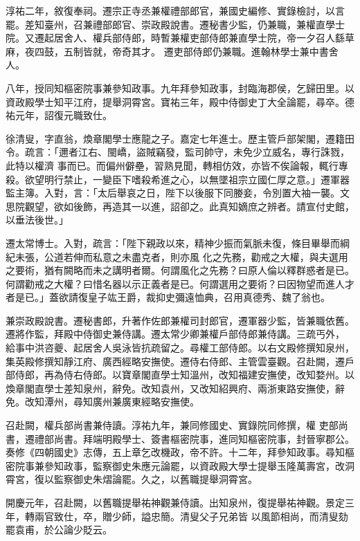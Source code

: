 \begin{pinyinscope}
 淳祐二年，敘復奉祠。遷宗正寺丞兼權禮部郎官，兼國史編修、實錄檢討，以言罷。差知臺州，召兼禮部郎官、崇政殿說書。遷秘書少監，仍兼職，兼權直學士院。又遷起居舍人、權兵部侍郎，時暫兼權吏部侍郎兼直學士院，帝一夕召人繇草麻，夜四鼓，五制皆就，帝奇其才。
 遷吏部侍郎仍兼職。進翰林學士兼中書舍人。



 八年，授同知樞密院事兼參知政事。九年拜參知政事，封臨海郡侯，乞歸田里。以資政殿學士知平江府，提舉洞霄宮。寶祐三年，殿中侍御史丁大全論罷，尋卒。德祐元年，詔復元職致仕。



 徐清叟，字直翁，煥章閣學士應龍之子。嘉定七年進士。歷主管戶部架閣，遷籍田令。疏言：「邇者江右、閩嶠，盜賊竊發，監司帥守，未免少立威名，專行誅戮，此特以權濟
 事而已。而偏州僻壘，習熟見聞，轉相仿效，亦皆不俟論報，輒行專殺。欲望明行禁止，一變臣下嗜殺希進之心，以無墜祖宗立國仁厚之意。」遷軍器監主簿。入對，言：「太后舉哀之日，陛下以後服下同媵妾，令別置大袖一襲。文思院觀望，欲如後飾，再造其一以進，詔卻之。此真知嫡庶之辨者。請宣付史館，以垂法後世。」



 遷太常博士。入對，疏言：「陛下親政以來，精神少振而氣脈未復，條目畢舉而綱紀未張，公道若伸而私意之未盡克者，則亦風
 化之先務，勸戒之大權，與夫選用之要術，猶有闕略而未之講明者爾。何謂風化之先務？曰原人倫以釋群惑者是已。何謂勸戒之大權？曰惜名器以示正義者是已。何謂選用之要術？曰因物望而進人才者是已。」蓋欲請復皇子竑王爵，裁抑史彌遠恤典，召用真德秀、魏了翁也。



 兼崇政殿說書。遷秘書郎，升著作佐郎兼權司封郎官，遷軍器少監，皆兼職依舊。遷將作監，拜殿中侍御史兼侍講。遷太常少卿兼權戶部侍郎兼侍講。三疏丐外，
 給事中洪咨夔、起居舍人吳泳皆抗疏留之。尋權工部侍郎。以右文殿修撰知泉州，集英殿修撰知靜江府、廣西經略安撫使。遷侍右侍郎、主管雲臺觀。召赴闕，遷戶部侍郎，再為侍右侍郎。以寶章閣直學士知溫州，改知福建安撫使，改知婺州。以煥章閣直學士差知泉州，辭免。改知袁州，又改知紹興府、兩浙東路安撫使，辭免。改知潭州，尋知廣州兼廣東經略安撫使。



 召赴闕，權兵部尚書兼侍讀。淳祐九年，兼同修國史、實錄院同修撰，權
 吏部尚書，遷禮部尚書。拜端明殿學士、簽書樞密院事，進同知樞密院事，封晉寧郡公。奏修《四朝國史》志傳，五上章乞改機政，帝不許。十二年，拜參知政事。尋知樞密院事兼參知政事，監察御史朱應元論罷，以資政殿大學士提舉玉隆萬壽宮，改洞霄宮，復以監察御史朱熠論罷。久之，以舊職提舉洞霄宮。



 開慶元年，召赴闕，以舊職提舉祐神觀兼侍讀。出知泉州，復提舉祐神觀。景定三年，轉兩官致仕，卒，贈少師，謚忠簡。清叟父子兄弟皆
 以風節相尚，而清叟劾罷袁甫，於公論少貶云。




\end{pinyinscope}
